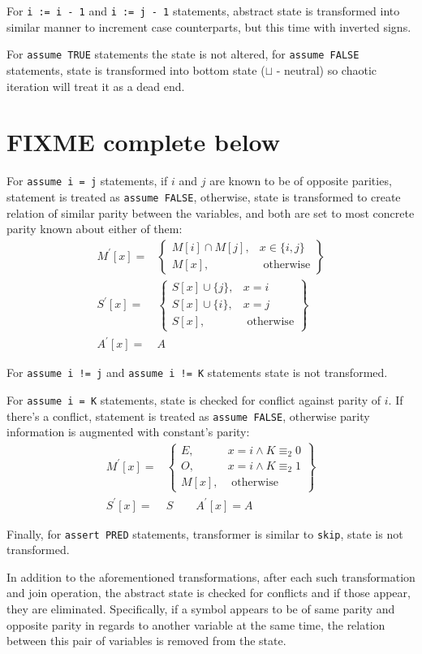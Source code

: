 For \texttt{i := i - 1} and \texttt{i := j - 1} statements, abstract state is transformed into similar manner to increment case counterparts, but this time with inverted signs.

For \texttt{assume TRUE} statements the state is not altered, for \texttt{assume FALSE} statements, state is transformed into bottom state ($\sqcup$ - neutral) so chaotic iteration will treat it as a dead end.

\part*{FIXME complete below}
For \texttt{assume i = j} statements, if $i$ and $j$ are known to be of opposite parities, statement is treated as \texttt{assume FALSE}, otherwise, state is transformed to create relation of similar parity between the variables, and both are set to most concrete parity known about either of them:
\begin{align*}
M^\prime[x] = & \left.
	\begin{cases}
		M[i]\cap M[j], & x \in \{i,j\} \\
		M[x], & \text{ otherwise}
	\end{cases}
\right\}\\
S^\prime[x] = & \left.
\begin{cases}
	S[x] \cup \{j\}, & x = i \\
	S[x] \cup \{i\}, & x = j \\
	S[x], & \text{ otherwise}
\end{cases}
\right\}\\
A^\prime[x] = & A
\end{align*}

For \texttt{assume i != j} and \texttt{assume i != K} statements state is not transformed.

For \texttt{assume i = K} statements, state is checked for conflict against parity of $i$. If there's a conflict, statement is treated as  \texttt{assume FALSE}, otherwise parity information is augmented with constant's parity:
\begin{align*}
M^\prime[x] = & \left.
	\begin{cases}
		{E}, & x = i \wedge K \equiv_{2} 0 \\
		{O}, & x = i \wedge K \equiv_{2} 1 \\
		M[x], & \text{ otherwise}
	\end{cases}
\right\}\\
S^\prime[x] = & S \qquad
A^\prime[x] =  A
\end{align*}


Finally, for \texttt{assert PRED} statements, transformer is similar to \texttt{skip}, state is not transformed.

In addition to the aforementioned transformations, after each such transformation and join operation, the abstract state is checked for conflicts and if those appear, they are eliminated. Specifically, if a symbol appears to be of same parity and opposite parity in regards to another variable at the same time, the relation between this pair of variables is removed from the state.
